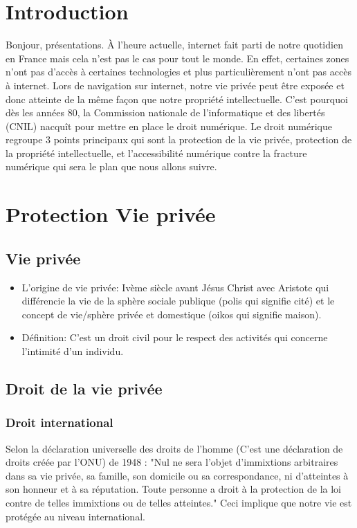 \documentclass{article}
\begin{document}
\section{Introduction}
Bonjour, présentations.
À l'heure actuelle, internet fait parti de notre quotidien en France mais cela n'est pas le cas pour tout le monde. En effet, certaines zones n'ont pas d'accès à certaines technologies et plus particulièrement n'ont pas accès à internet.
Lors de navigation sur internet, notre vie privée peut être exposée et donc atteinte de la même façon que notre propriété intellectuelle.
C'est pourquoi dès les années 80, la Commission nationale de l'informatique et des libertés (CNIL) nacquît pour mettre en place le droit numérique. 
Le droit numérique regroupe 3 points principaux qui sont la protection de la vie privée, protection de la propriété intellectuelle, et l’accessibilité numérique contre la fracture numérique qui sera le plan que nous allons suivre.
\section{Protection Vie privée}
\subsection{Vie privée}
\begin{itemize}
    \item L'origine de vie privée: Ivème siècle avant Jésus Christ avec Aristote qui différencie la vie de la sphère sociale publique (polis qui signifie cité)  et le concept de vie/sphère privée et domestique (oikos qui signifie maison).
    \item Définition: C’est un droit civil pour le respect des activités qui concerne l’intimité d’un individu. 
\end{itemize}
\subsection{Droit de la vie privée}
\subsubsection{Droit international}
Selon la déclaration universelle des droits de l’homme (C’est une déclaration de droits créée par
l’ONU) de 1948 :
"Nul ne sera l'objet d'immixtions arbitraires dans sa vie privée, sa famille, son domicile ou sa correspondance, ni d'atteintes à son honneur et à sa réputation. Toute personne a droit à la protection de la loi contre de telles immixtions ou de telles atteintes." 
Ceci implique que notre vie est protégée au niveau international.
\end{document}
